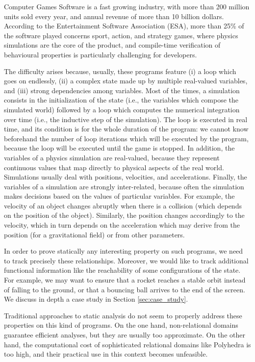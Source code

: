Computer Games Software is a fast growing industry, with more than 200 million units sold every year, and annual revenue of more than 10 billion dollars. According to the Entertainment Software Association (ESA), more than 25\% of the software played concerns sport, action, and strategy games, where physics simulations are the core of the product, and compile-time verification of behavioural properties is particularly challenging for developers. 

The difficulty arises because, usually, these programs feature (i) a  loop which goes on endlessly, (ii) a complex state made up by multiple real-valued variables, and (iii) strong dependencies among variables. 
Most of the times, a simulation consists in the initialization of the state (i.e., the variables which compose the simulated world) followed by a  loop which computes the numerical integration over time (i.e., the inductive step of the simulation). The  loop is executed in real time, and its condition is  for the whole duration of the program: we cannot know beforehand the number of loop iterations which will be executed by the program, because the loop will be executed until the game is stopped.
In addition, the variables of a physics simulation are real-valued, because they represent continuous values that map directly to physical aspects of the real world. Simulations usually deal with positions, velocities, and accelerations. 
Finally, the variables of a simulation are strongly inter-related, because often the simulation makes decisions based on the values of particular variables. For example, the velocity of an object changes abruptly when there is a collision (which depends on the position of the object). Similarly, the position changes accordingly to the velocity, which in turn depends on the acceleration which may derive from the position (for a gravitational field) or from other parameters. 

In order to prove statically any interesting property on such programs, we need to track precisely these relationships. Moreover, we would like to track additional functional information like the reachability of some configurations of the state. For example, we may want to ensure that a rocket reaches a stable orbit instead of falling to the ground, or that a bouncing ball arrives to the end of the screen. We discuss in depth a case study in Section \ref{sec:case_study}. 

Traditional approaches to static analysis do not seem to properly address these properties on this kind of programs. On the one hand, non-relational domains guarantee efficient analyses, but they are usually too approximate. On the other hand, the computational cost of sophisticated relational domains like Polyhedra \cite{CH78} is too high, and their practical use in this context becomes unfeasible.   

